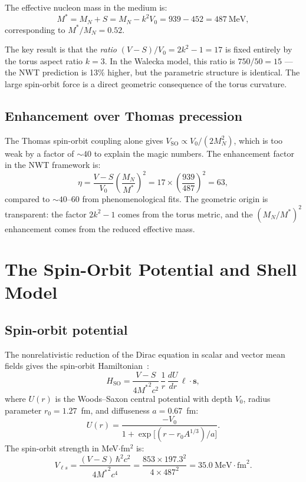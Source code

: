 \documentclass[11pt,a4paper]{article}
\begin{document}
The effective nucleon mass in the medium is:
\begin{equation}
  M^* = M_N + S = M_N - k^2 V_0 = 939 - 452 = 487~\text{MeV},
  \label{eq:mstar}
\end{equation}
corresponding to $M^*/M_N = 0.52$.

The key result is that the \emph{ratio} $(V-S)/V_0 = 2k^2 - 1 = 17$ is fixed
entirely by the torus aspect ratio $k=3$.  In the Walecka model, this ratio is
$750/50 = 15$ --- the NWT prediction is 13\% higher, but the parametric
structure is identical.  The large spin-orbit force is a direct geometric
consequence of the torus curvature.

\subsection{Enhancement over Thomas precession}

The Thomas spin-orbit coupling alone gives
$V_{\text{SO}} \propto V_0/(2M_N^2)$, which is too weak by a factor of
$\sim 40$ to explain the magic numbers.  The enhancement factor in the
NWT framework is:
\begin{equation}
  \eta = \frac{V-S}{V_0}\left(\frac{M_N}{M^*}\right)^2
  = 17 \times \left(\frac{939}{487}\right)^2 = 63,
  \label{eq:enhancement}
\end{equation}
compared to $\sim 40$--$60$ from phenomenological fits.  The geometric origin
is transparent: the factor $2k^2-1$ comes from the torus metric, and the
$(M_N/M^*)^2$ enhancement comes from the reduced effective mass.


\section{The Spin-Orbit Potential and Shell Model}
\label{sec:spinorbit}

\subsection{Spin-orbit potential}

The nonrelativistic reduction of the Dirac equation in scalar and vector
mean fields gives the spin-orbit Hamiltonian~\cite{serot1986}:
\begin{equation}
  H_{\text{SO}} = \frac{V-S}{4{M^*}^2 c^2}\,\frac{1}{r}\,
  \frac{dU}{dr}\,\boldsymbol{\ell}\cdot\mathbf{s},
  \label{eq:Hso}
\end{equation}
where $U(r)$ is the Woods--Saxon central potential with depth $V_0$, radius
parameter $r_0 = 1.27$~fm, and diffuseness $a = 0.67$~fm:
\begin{equation}
  U(r) = \frac{-V_0}{1 + \exp\!\bigl[(r - r_0 A^{1/3})/a\bigr]}.
  \label{eq:ws}
\end{equation}
The spin-orbit strength in MeV$\cdot$fm$^2$ is:
\begin{equation}
  V_{\ell s} = \frac{(V-S)\,\hbar^2 c^2}{4{M^*}^2 c^4}
  = \frac{853 \times 197.3^2}{4 \times 487^2}
  = 35.0~\text{MeV}\!\cdot\!\text{fm}^2.
  \label{eq:Vls}
\end{equation}
\end{document}
